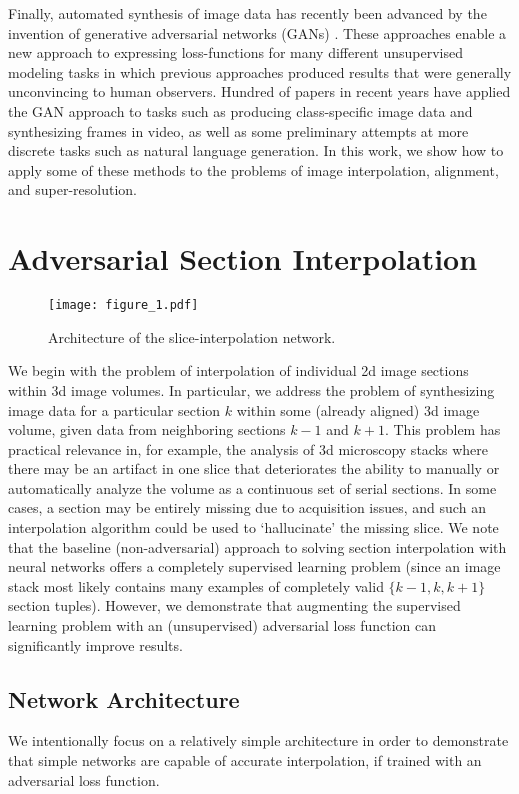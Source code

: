\documentclass{article} %
\begin{document}
Finally, automated synthesis of image data has recently been advanced by the invention of generative adversarial networks (GANs) \cite{goodfellow2014generative, radford2015unsupervised}. These approaches enable a new approach to expressing loss-functions for many different unsupervised modeling tasks in which previous approaches produced results that were generally unconvincing to human observers. Hundred of papers in recent years have applied the GAN approach to tasks such as producing class-specific image data and synthesizing frames in video, as well as some preliminary attempts at more discrete tasks such as natural language generation. In this work, we show how to apply some of these methods to the problems of image interpolation, alignment, and super-resolution. 

\section{Adversarial Section Interpolation}

\begin{figure}
    \centering
    \texttt{[image: figure\_1.pdf]}
    \caption{Architecture of the slice-interpolation network.}
    \label{fig:architecture_slice_interpolation}
\end{figure}

We begin with the problem of interpolation of individual 2d image sections within 3d image volumes. In particular, we address the problem of synthesizing image data for a particular section $k$ within some (already aligned) 3d image volume, given data from neighboring sections $k-1$ and $k+1$. This problem has practical relevance in, for example, the analysis of 3d microscopy stacks where there may be an artifact in one slice that deteriorates the ability to manually or automatically analyze the volume as a continuous set of serial sections. In some cases, a section may be entirely missing due to acquisition issues, and such an interpolation algorithm could be used to `hallucinate' the missing slice. 
We note that the baseline (non-adversarial) approach to solving section interpolation with neural networks offers a completely supervised learning problem (since an image stack most likely contains many examples of completely valid $\{k-1, k, k+1\}$  section tuples). However, we demonstrate that augmenting the supervised learning problem with an (unsupervised) adversarial loss function can significantly improve results. 

\subsection{Network Architecture}
We intentionally focus on a relatively simple architecture in order to demonstrate that simple networks are capable of accurate interpolation, if trained with an adversarial loss function. 
\end{document}
